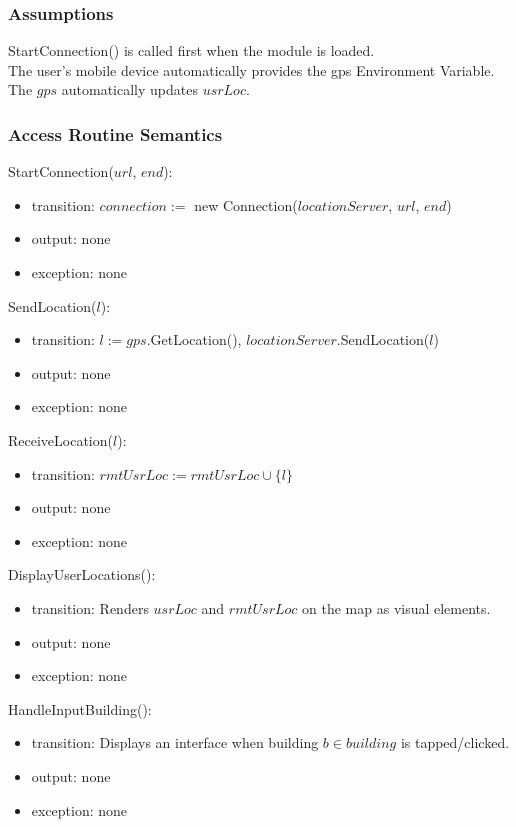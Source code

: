 \documentclass[12pt, titlepage]{article}
\begin{document}
\subsubsection{Assumptions}

StartConnection() is called first when the module is loaded.\\
The user's mobile device automatically provides the gps Environment Variable.\\
The $gps$ automatically updates $usrLoc$.

\subsubsection{Access Routine Semantics}

\noindent StartConnection($url$, $end$):
\begin{itemize}
\item transition: $connection := $ new Connection($locationServer$, $url$, $end$)
\item output: none
\item exception: none
\end{itemize}

\noindent SendLocation($l$):
\begin{itemize}
\item transition: $l := gps$.GetLocation(), $locationServer$.SendLocation($l$)
\item output: none
\item exception: none
\end{itemize}

\noindent ReceiveLocation($l$):
\begin{itemize}
\item transition: $rmtUsrLoc := rmtUsrLoc \cup \{l\}$
\item output: none
\item exception: none
\end{itemize}

\noindent DisplayUserLocations():
\begin{itemize}
\item transition: Renders $usrLoc$ and $rmtUsrLoc$ on the map as visual elements.
\item output: none
\item exception: none
\end{itemize}

\noindent HandleInputBuilding():
\begin{itemize}
\item transition: Displays an interface when building $b \in building$ is tapped/clicked.
\item output: none
\item exception: none
\end{itemize}
\end{document}
